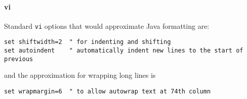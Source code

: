 \paragraph{vi}\label{options:vi}

Standard {\tt vi} options that would approximate Java\TMweb{} formatting are:
\begin{verbatim}
set shiftwidth=2  " for indenting and shifting
set autoindent    " automatically indent new lines to the start of previous
\end{verbatim}
and the approximation for wrapping long lines is
\begin{verbatim}
set wrapmargin=6  " to allow autowrap text at 74th column
\end{verbatim}


